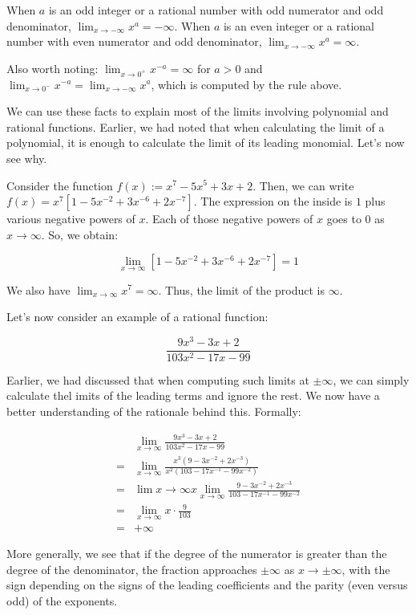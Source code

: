 \documentclass[10pt]{amsart}
\begin{document}
When $a$ is an odd integer or a rational number with odd numerator and
odd denominator, $\lim_{x \to -\infty} x^a = -\infty$. When $a$ is an
even integer or a rational number with even numerator and odd
denominator, $\lim_{x \to -\infty} x^a = \infty$. 

Also worth noting: $\lim_{x \to 0^+} x^{-a} = \infty$ for $a > 0$ and
$\lim_{x \to 0^-} x^{-a} = \lim_{x \to -\infty} x^a$, which is
computed by the rule above.

We can use these facts to explain most of the limits involving
polynomial and rational functions. Earlier, we had noted that when
calculating the limit of a polynomial, it is enough to calculate the
limit of its leading monomial. Let's now see why.

Consider the function $f(x) := x^7 - 5x^5 + 3x + 2$. Then, we can
write $f(x) = x^7\left[ 1 - 5x^{-2} + 3x^{-6} + 2x^{-7}\right]$. The
expression on the inside is $1$ plus various negative powers of
$x$. Each of those negative powers of $x$ goes to $0$ as $x \to
\infty$. So, we obtain:

$$\lim_{x \to \infty} [1 - 5x^{-2} + 3x^{-6} + 2x^{-7}] = 1$$

We also have $\lim_{x \to \infty} x^7 = \infty$. Thus, the limit of
the product is $\infty$.

Let's now consider an example of a rational function:

$$\frac{9x^3 - 3x + 2}{103x^2 - 17x - 99}$$

Earlier, we had discussed that when computing such limits at $\pm
\infty$, we can simply calculate thel imits of the leading terms and
ignore the rest. We now have a better understanding of the rationale
behind this. Formally:

\begin{align*}
  & \lim_{x \to \infty} \frac{9x^3 - 3x + 2}{103x^2 - 17x - 99}\\
  = & \lim_{x \to \infty} \frac{x^3(9 - 3x^{-2} + 2x^{-3})}{x^2(103 - 17x^{-1} - 99x^{-2})}\\
  = & \lim{x \to \infty} x \lim_{x \to \infty} \frac{9 - 3x^{-2} + 2x^{-3}}{103 - 17x^{-1} - 99x^{-2}}\\
  = & \lim_{x \to \infty} x \cdot \frac{9}{103}\\
  = & +\infty
\end{align*}

More generally, we see that if the degree of the numerator is greater
than the degree of the denominator, the fraction approaches $\pm
\infty$ as $x \to \pm \infty$, with the sign depending on the signs of
the leading coefficients and the parity (even versus odd) of the
exponents.
\end{document}
